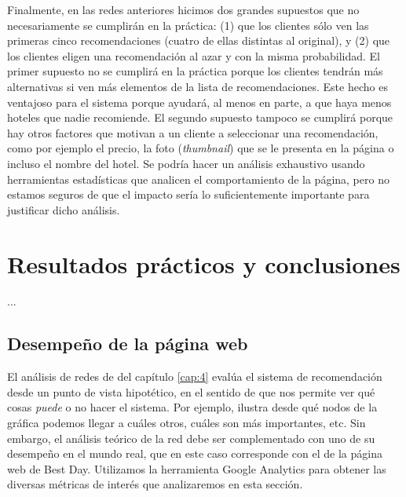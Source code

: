 \documentclass[12pt]{report}
\begin{document}
Finalmente, en las redes anteriores hicimos dos grandes supuestos que no necesariamente se cumplirán en la práctica: (1) que los clientes sólo ven las primeras cinco recomendaciones (cuatro de ellas distintas al original), y (2) que los clientes eligen una recomendación al azar y con la misma probabilidad. El primer supuesto no se cumplirá en la práctica porque los clientes tendrán más alternativas si ven más elementos de la lista de recomendaciones. Este hecho es ventajoso para el sistema porque ayudará, al menos en parte, a que haya menos hoteles que nadie recomiende. El segundo supuesto tampoco se cumplirá porque hay otros factores que motivan a un cliente a seleccionar una recomendación, como por ejemplo el precio, la foto (\emph{thumbnail}) que se le presenta en la página o incluso el nombre del hotel. Se podría hacer un análisis exhaustivo usando herramientas estadísticas que analicen el comportamiento de la página, pero no estamos seguros de que el impacto sería lo suficientemente importante para justificar dicho análisis.

\chapter{Resultados prácticos y conclusiones} \label{cap:5}

...

\section{Desempeño de la página web}

El análisis de redes de del capítulo \ref{cap:4} evalúa el sistema de recomendación desde un punto de vista hipotético, en el sentido de que nos permite ver qué cosas \emph{puede} o no hacer el sistema. Por ejemplo, ilustra desde qué nodos de la gráfica podemos llegar a cuáles otros, cuáles son más importantes, etc. Sin embargo, el análisis teórico de la red debe ser complementado con uno de su desempeño en el mundo real, que en este caso corresponde con el de la página web de Best Day. Utilizamos la herramienta Google Analytics \cite{analytics} para obtener las diversas métricas de interés que analizaremos en esta sección.
\end{document}
